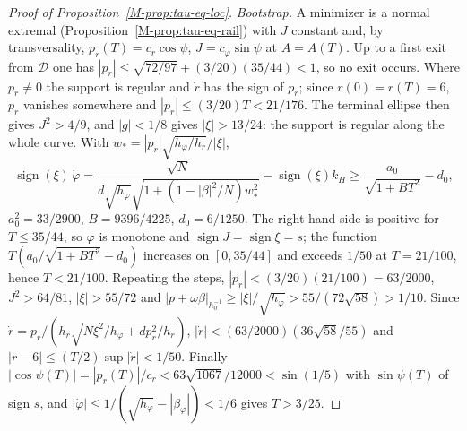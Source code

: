 \documentclass[aip,jmp,amsmath,amssymb,reprint]{revtex4-2}
\theoremstyle{plain}
\theoremstyle{definition}
\begin{document}
\begin{proof}[Proof of Proposition~\ref{M-prop:tau-eq-loc}]
\emph{Bootstrap.} A minimizer is a normal extremal (Proposition~\ref{M-prop:tau-eq-rail}) with $J$
constant and, by transversality, $p_r(T)=c_r\cos\psi$, $J=c_\varphi\sin\psi$ at $A=A(T)$. Up to a first exit
from $\mathcal D$ one has $|p_r|\le\sqrt{72/97}+(3/20)(35/44)<1$, so no exit occurs. Where $p_r\ne0$ the
support is regular and $\dot r$ has the sign of $p_r$; since $r(0)=r(T)=6$, $p_r$ vanishes somewhere
and $|p_r|\le(3/20)T<21/176$. The terminal ellipse then gives $J^2>4/9$, and $|g|<1/8$ gives
$|\xi|>13/24$: the support is regular along the whole curve. With
$w_*=|p_r|\sqrt{h_\varphi/h_r}/|\xi|$,
\[
  \operatorname{sign}(\xi)\,\dot\varphi=\frac{\sqrt N}{d\sqrt{h_\varphi}\sqrt{1+(1-|\beta|^2/N)w_*^2}}-\operatorname{sign}(\xi)k_H
  \ge\frac{a_0}{\sqrt{1+BT^2}}-d_0,
\]
$a_0^2=33/2900$, $B=9396/4225$, $d_0=6/1250$. The right-hand side is positive for $T\le35/44$, so
$\varphi$ is monotone and $\operatorname{sign}J=\operatorname{sign}\xi=s$; the function $T(a_0/\sqrt{1+BT^2}-d_0)$
increases on $[0,35/44]$ and exceeds $1/50$ at $T=21/100$, hence $T<21/100$. Repeating the steps,
$|p_r|<(3/20)(21/100)=63/2000$, $J^2>64/81$, $|\xi|>55/72$ and
$|p+\omega\beta|_{h_0^{-1}}\ge|\xi|/\sqrt{h_\varphi}>55/(72\sqrt{58})>1/10$. Since
$\dot r=p_r/(h_r\sqrt{N\xi^2/h_\varphi+dp_r^2/h_r})$, $|\dot r|<(63/2000)(36\sqrt{58}/55)$ and
$|r-6|\le(T/2)\sup|\dot r|<1/50$. Finally $|\cos\psi(T)|=|p_r(T)|/c_r<63\sqrt{1067}/12000<\sin(1/5)$
with $\sin\psi(T)$ of sign $s$, and $|\dot\varphi|\le1/(\sqrt{h_\varphi}-|\beta_\varphi|)<1/6$ gives $T>3/25$.
\end{proof}
\end{document}
